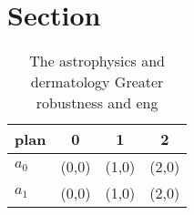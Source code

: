 \documentclass[a4paper]{article}
\begin{document}
\section{Section}

\begin{table}
\begin{adjustbox}{width=0.6\columnwidth}
\begin{tabular}{|l|l|l|l|}
\hline
\textbf{plan} & \multicolumn{1}{c|}{\textbf{0}} & \multicolumn{1}{c|}{\textbf{1}} & \multicolumn{1}{c|}{\textbf{2}} \\ \hline
\textbf{$a_0$}  & (0,0) & (1,0) & (2,0) \\ \hline
\textbf{$a_1$}  & (0,0) & (1,0) & (2,0) \\ \hline
\end{tabular}
\end{adjustbox}
\caption{The astrophysics and dermatology Greater robustness and eng
}
\end{table}
\end{document}
